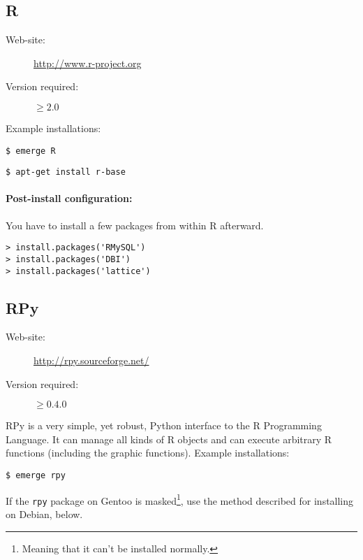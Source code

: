 \subsection{R}
\begin{description}
\item[Web-site:] \url{http://www.r-project.org}
\item[Version required:] $\geq2.0$
\end{description}
Example installations:
\begin{lstlisting}[frame=trBL, caption=Installing R on Gentoo GNU/Linux ,label=lst:instRg]
$ emerge R
\end{lstlisting}
\begin{lstlisting}[frame=trBL, caption=Installing R on Debian GNU/Linux ,label=lst:instRd]
$ apt-get install r-base
\end{lstlisting}
\paragraph*{Post-install configuration:}
You have to install a few packages from within R afterward.
\begin{lstlisting}[frame=trBL, caption=Installing aditional packages from within R ,label=lst:instRpkgs]
> install.packages('RMySQL')
> install.packages('DBI')
> install.packages('lattice')
\end{lstlisting}

\subsection{RPy}
\begin{description}
\item[Web-site:] \url{http://rpy.sourceforge.net/}
\item[Version required:] $\geq0.4.0$
\end{description}
RPy is a very simple, yet robust, Python interface to the R Programming Language. It can manage all kinds of R objects and can execute arbitrary R functions (including the graphic functions). 
Example installations:
\begin{lstlisting}[frame=trBL, caption=Installing RPy on Gentoo GNU/Linux ,label=lst:instRPyg]
$ emerge rpy
\end{lstlisting}
If the \texttt{rpy} package on Gentoo is masked\footnote{Meaning that it can't be installed normally.}, use the method described for installing on Debian, below. 

